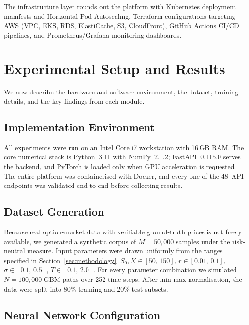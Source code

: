 \documentclass[conference]{IEEEtran}
\begin{document}
The infrastructure layer rounds out the platform with Kubernetes deployment manifests and Horizontal Pod Autoscaling, Terraform configurations targeting AWS (VPC, EKS, RDS, ElastiCache, S3, CloudFront), GitHub Actions CI/CD pipelines, and Prometheus/Grafana monitoring dashboards.

\section{Experimental Setup and Results}\label{sec:experiments}

We now describe the hardware and software environment, the dataset, training details, and the key findings from each module.

\subsection{Implementation Environment}

All experiments were run on an Intel Core i7 workstation with 16\,GB RAM. The core numerical stack is Python~3.11 with NumPy~2.1.2; FastAPI~0.115.0 serves the backend, and PyTorch is loaded only when GPU acceleration is requested. The entire platform was containerised with Docker, and every one of the 48~API endpoints was validated end-to-end before collecting results.

\subsection{Dataset Generation}

Because real option-market data with verifiable ground-truth prices is not freely available, we generated a synthetic corpus of $M = 50{,}000$ samples under the risk-neutral measure. Input parameters were drawn uniformly from the ranges specified in Section~\ref{sec:methodology}: $S_0, K \in [50,\,150]$, $r \in [0.01,\,0.1]$, $\sigma \in [0.1,\,0.5]$, $T \in [0.1,\,2.0]$. For every parameter combination we simulated $N = 100{,}000$ GBM paths over 252 time steps. After min-max normalisation, the data were split into 80\% training and 20\% test subsets.

\subsection{Neural Network Configuration}
\end{document}
